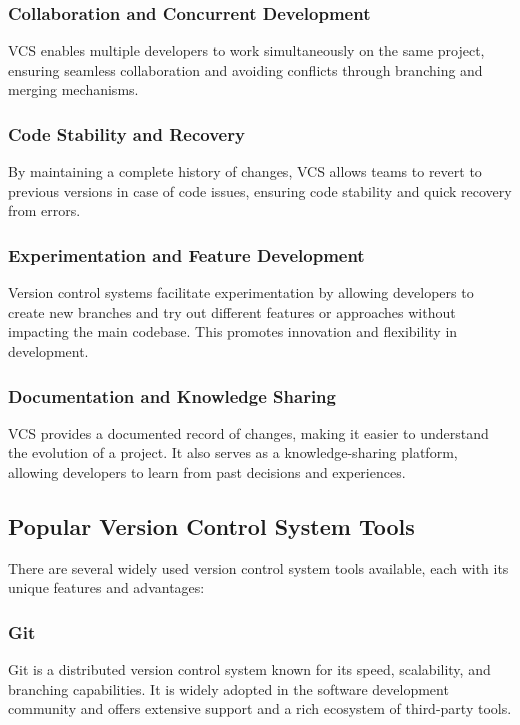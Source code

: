 \subsubsection*{Collaboration and Concurrent Development}
VCS enables multiple developers to work simultaneously on the same project, ensuring seamless collaboration and avoiding conflicts through branching and merging mechanisms.

\subsubsection*{Code Stability and Recovery}
By maintaining a complete history of changes, VCS allows teams to revert to previous versions in case of code issues, ensuring code stability and quick recovery from errors.

\subsubsection*{Experimentation and Feature Development}
Version control systems facilitate experimentation by allowing developers to create new branches and try out different features or approaches without impacting the main codebase. This promotes innovation and flexibility in development.

\subsubsection*{Documentation and Knowledge Sharing}
VCS provides a documented record of changes, making it easier to understand the evolution of a project. It also serves as a knowledge-sharing platform, allowing developers to learn from past decisions and experiences.

\newpage

\subsection*{Popular Version Control System Tools}

There are several widely used version control system tools available, each with its unique features and advantages:

\subsubsection*{Git}
Git is a distributed version control system known for its speed, scalability, and branching capabilities. It is widely adopted in the software development community and offers extensive support and a rich ecosystem of third-party tools.

